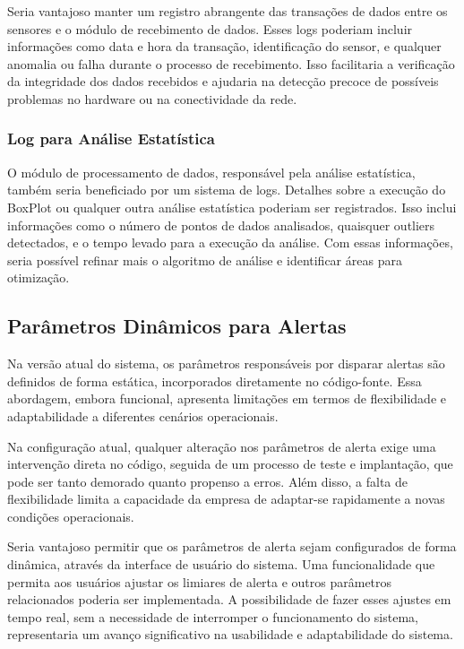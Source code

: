 Seria vantajoso manter um registro abrangente das transações de dados entre os sensores e o módulo de recebimento de dados. Esses logs poderiam incluir informações como data e hora da transação, identificação do sensor, e qualquer anomalia ou falha durante o processo de recebimento. Isso facilitaria a verificação da integridade dos dados recebidos e ajudaria na detecção precoce de possíveis problemas no hardware ou na conectividade da rede.

\subsubsection{Log para Análise Estatística}

O módulo de processamento de dados, responsável pela análise estatística, também seria beneficiado por um sistema de logs. Detalhes sobre a execução do BoxPlot ou qualquer outra análise estatística poderiam ser registrados. Isso inclui informações como o número de pontos de dados analisados, quaisquer outliers detectados, e o tempo levado para a execução da análise. Com essas informações, seria possível refinar mais o algoritmo de análise e identificar áreas para otimização.


\subsection{Parâmetros Dinâmicos para Alertas}

Na versão atual do sistema, os parâmetros responsáveis por disparar alertas são definidos de forma estática, incorporados diretamente no código-fonte. Essa abordagem, embora funcional, apresenta limitações em termos de flexibilidade e adaptabilidade a diferentes cenários operacionais.

Na configuração atual, qualquer alteração nos parâmetros de alerta exige uma intervenção direta no código, seguida de um processo de teste e implantação, que pode ser tanto demorado quanto propenso a erros. Além disso, a falta de flexibilidade limita a capacidade da empresa de adaptar-se rapidamente a novas condições operacionais.

Seria vantajoso permitir que os parâmetros de alerta sejam configurados de forma dinâmica, através da interface de usuário do sistema. Uma funcionalidade que permita aos usuários ajustar os limiares de alerta e outros parâmetros relacionados poderia ser implementada. A possibilidade de fazer esses ajustes em tempo real, sem a necessidade de interromper o funcionamento do sistema, representaria um avanço significativo na usabilidade e adaptabilidade do sistema.

